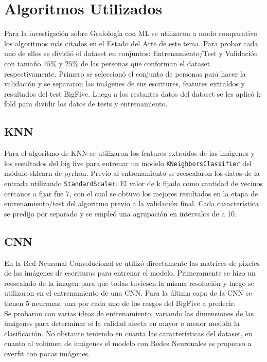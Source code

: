 \documentclass[10pt, a4paper]{article}
\begin{document}
    \section{Algoritmos Utilizados}
        Para la investigsci\'on sobre Grafolog\'ia con ML se utilizaron a modo comparativo los algoritmos m\'as citados en el Estado del Arte de este tema. 
        Para probar cada uno de ellos se dividi\'o el dataset en  conjuntos: Entrenamiento/Test y Validaci\'on con tama\~no $75\%$ y $25\%$ de las personas que conforman el dataset respectivamente.
        Primero se seleccion\'o el conjunto de personas para hacer la validaci\'on y se separaron las im\'agenes de sus escritures, features extra\'idos y resultados del test BigFive. Luego a los restantes datos del dataset 
        se les aplic\'o k-fold para dividir los datos de tests y entrenamiento.  
        
        \subsection{KNN}
            Para el algoritmo de KNN se utilizaron los features extra\'idos de las im\'agenes y los resultados del big five para entrenar un modelo \texttt{KNeighborsClassifier} del m\'odulo sklearn de pyrhon. 
            Previo al entrenamiento se reescalaron los datos de la entrada utilizando \texttt{StandardScaler}. El valor de k fijado como cantidad de vecinos cercanos a fijar fue 7, con el cual se obtuvo los mejores resultados en 
            la etapa de entrenamiento/test del algoritmo previo a la validaci\'on final. Cada caracter\'istica se predijo por separado y se emple\'o una agrupaci\'on en intervalos de a 10.
        
        \subsection{CNN}
            En la Red Neuronal Convolucional se utiliz\'o directamente las matrices de pixeles de las im\'agenes de escrituras para entrenar el modelo. 
            Primeramente se hizo un reescalado de la imagen para que todas tuviesen la misma resoluci\'on y luego se utilizaron en el entrenamiento de una CNN.
            Para la \'ultima capa de la CNN se tienen 5 neuronas, una por cada uno de los rasgos del BigFive a predecir.\\
            
            Se probaron con varias ideas de entrenamiento, variando las dimensiones de las im\'agenes para determinar si la calidad afecta en mayor o menor medida 
            la clasificaci\'on. No obstante teniendo en cuanta las caracter\'isticas del dataset, en cuanto al vol\'umen de im\'agenes el modelo con Redes Neuronales es propenso 
            a overfit con pocas im\'agenes. 
\end{document}
